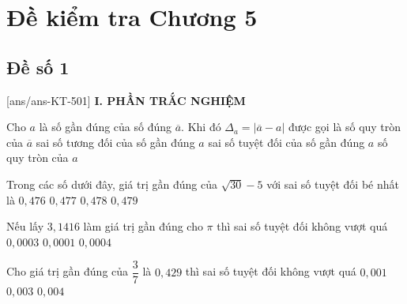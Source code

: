 \section*{Đề kiểm tra Chương 5}
\subsection*{Đề số 1}
\setcounter{ex}{0}\setcounter{bt}{0}
[ans/ans-KT-501]
\noindent\textbf{I. PHẦN TRẮC NGHIỆM}
\begin{ex}%
	Cho $a$ là số gần đúng của số đúng $\overline{a}$. Khi đó $\Delta_a = |\overline{a} - a|$ được gọi là 
	\choice
	{số quy tròn của $\overline{a}$}
	{sai số tương đối của số gần đúng $a$}
	{\True sai số tuyệt đối của số gần đúng $a$}
	{số quy tròn của $a$}
\end{ex}

\begin{ex}%
	Trong các số dưới đây, giá trị gần đúng của $\sqrt{30}-5$ với sai số tuyệt đối bé nhất là
	\choice
	{$0{,}476$}
	{\True $0{,}477$}
	{$0{,}478$}
	{$0{,}479$}
\end{ex}

\begin{ex}%
	Nếu lấy $3,1416$ làm giá trị gần đúng cho $\pi$ thì sai số tuyệt đối không vượt quá 
	{$0, 0003$}
	{\True $0, 0001$}
	{$0, 0004$}
\end{ex}

\begin{ex}%
	Cho giá trị gần đúng của $\dfrac{3}{7}$ là $0{,}429$ thì sai số tuyệt đối không vượt quá 
	{\True $0{,}001$}
	{$ 0{,}003$}
	{$0{,}004$}
\end{ex}

